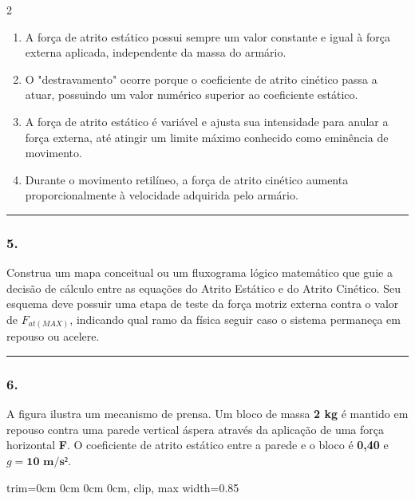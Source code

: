 \documentclass[twoside, 10pt, a4paper]{article}
\newlength{\espacoPreQuestao}\setlength{\espacoPreQuestao}{0.1cm}
\newlength{\espacoQuestao}\setlength{\espacoQuestao}{0.2cm}
\newlength{\espacoAlt}\setlength{\espacoAlt}{0.2cm}
\newcommand{\larguraTikz}{0.85\linewidth}
\begin{document}
\begin{multicols*}{2}
\begin{enumerate}[label=\alph*), itemsep=\espacoAlt]
    \item A força de atrito estático possui sempre um valor constante e igual à força externa aplicada, independente da massa do armário.
    \item O "destravamento" ocorre porque o coeficiente de atrito cinético passa a atuar, possuindo um valor numérico superior ao coeficiente estático.
    \item A força de atrito estático é variável e ajusta sua intensidade para anular a força externa, até atingir um limite máximo conhecido como eminência de movimento.
    \item Durante o movimento retilíneo, a força de atrito cinético aumenta proporcionalmente à velocidade adquirida pelo armário.
\end{enumerate}
\par\vspace{\espacoQuestao}

\noindent\textcolor{CorLinha}{\rule{\linewidth}{0.5pt}} 
\par\vspace{\espacoPreQuestao}
\subsubsection*{5.} Construa um mapa conceitual ou um fluxograma lógico matemático que guie a decisão de cálculo entre as equações do Atrito Estático e do Atrito Cinético. Seu esquema deve possuir uma etapa de teste da força motriz externa contra o valor de $F_{at(MAX)}$, indicando qual ramo da física seguir caso o sistema permaneça em repouso ou acelere.
\par\vspace{\espacoQuestao}

\noindent\textcolor{CorLinha}{\rule{\linewidth}{0.5pt}} 
\par\vspace{\espacoPreQuestao}
\subsubsection*{6.} A figura ilustra um mecanismo de prensa. Um bloco de massa \textbf{2 kg} é mantido em repouso contra uma parede vertical áspera através da aplicação de uma força horizontal \textbf{F}. O coeficiente de atrito estático entre a parede e o bloco é \textbf{0,40} e $g = \textbf{10 m/s²}$.

\begin{center}
\begin{adjustbox}{trim=0cm 0cm 0cm 0cm, clip, max width=\larguraTikz}
\end{adjustbox}
\end{center}
\end{multicols*}
\end{document}
